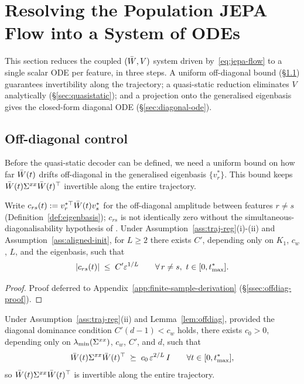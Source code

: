 \section{Resolving the Population JEPA Flow into a System of ODEs}

This section reduces the coupled $(\bar{W}, V)$ system driven by~\eqref{eq:jepa-flow} to a
single scalar ODE per feature, in three steps. A uniform off-diagonal bound
(\S\ref{sec:ode-prelim}) guarantees invertibility along the trajectory; a
quasi-static reduction eliminates $V$ analytically (\S\ref{sec:quasistatic}); and a
projection onto the generalised eigenbasis gives the closed-form diagonal ODE
(\S\ref{sec:diagonal-ode}).

\subsection{Off-diagonal control}
\label{sec:ode-prelim}

Before the quasi-static decoder can be defined, we need a uniform bound on how far
$\bar{W}(t)$ drifts off-diagonal in the generalised eigenbasis $\{v_r^*\}$. This bound keeps
$\bar{W}(t)\Sigma^{xx}\bar{W}(t)^\top$ invertible along the entire trajectory.

\begin{lemma}
\label{lem:offdiag}
Write $c_{rs}(t) := v_r^{*\top} \bar{W}(t) v_s^*$ for the off-diagonal amplitude between
features $r \neq s$ (Definition~\ref{def:eigenbasis}); $c_{rs}$ is not identically zero
without the simultaneous-diagonalisability hypothesis of \citet{Littwin2024}. Under
Assumption~\ref{ass:traj-reg}(i)-(ii) and Assumption~\ref{ass:aligned-init}, for $L \ge 2$
there exists $C'$, depending only on $K_1$, $c_w$, $L$, and the eigenbasis, such that
\begin{equation}
\label{eq:offdiag-bound}
|c_{rs}(t)| \;\le\; C' \varepsilon^{1/L} \qquad \forall\, r \neq s,\ t \in [0, t_{\max}^*].
\end{equation}
\end{lemma}

\begin{proof}
Proof deferred to Appendix~\ref{app:finite-sample-derivation}
(\S\ref{ssec:offdiag-proof}).
\end{proof}

\begin{corollary}
\label{cor:pd-lower}
Under Assumption~\ref{ass:traj-reg}(ii) and Lemma~\ref{lem:offdiag}, provided the diagonal
dominance condition $C'(d-1) < c_w$ holds, there exists $c_0 > 0$, depending only on
$\lambda_{\min}(\Sigma^{xx})$, $c_w$, $C'$, and $d$, such that
\[
\bar{W}(t)\Sigma^{xx}\bar{W}(t)^\top \;\succeq\; c_0\,\varepsilon^{2/L}\,I \qquad \forall t \in [0, t_{\max}^*],
\]
so $\bar{W}(t)\Sigma^{xx}\bar{W}(t)^\top$ is invertible along the entire trajectory.
\end{corollary}

